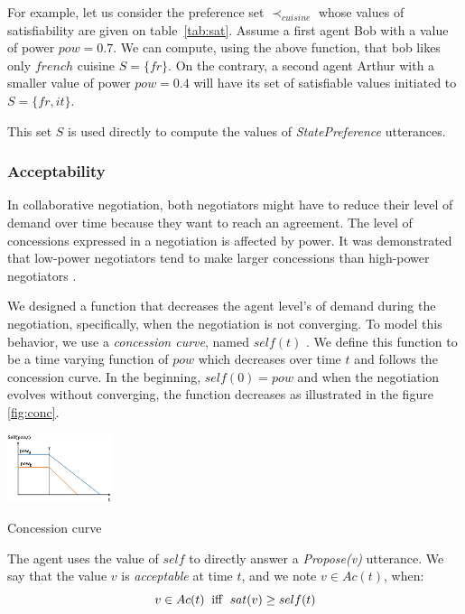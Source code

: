 \documentclass[conference, letterpaper]{IEEEtran}
\begin{document}
	For example, let us consider the preference set $\prec_{cuisine}$ whose values of satisfiability are given on table~\ref{tab:sat}. Assume a first agent Bob with a value of power $pow = 0.7$. We can compute, using the above function, that bob likes only $french$ cuisine $S= \{fr\}$. On the contrary, a second agent Arthur with a smaller value of power $pow=0.4$ will have its set of satisfiable values initiated to $S= \{fr, it\}$. 
	
    This set $S$ is used directly to compute the values of \emph{StatePreference} utterances.
	
	\subsubsection{Acceptability}
	\label{sec:acc}
	In collaborative negotiation, both negotiators might have to reduce their level of demand over time because they want to reach an agreement. The level of concessions expressed in a negotiation is affected by power. It was demonstrated that low-power negotiators tend to make larger concessions than high-power negotiators \cite{de1995impact}.
	
	We designed a function that decreases the agent level's of demand during the negotiation, specifically, when the negotiation is not converging.  To model this behavior, we use a \emph{concession curve}, named $self(t)$ . %
	We define this function to be a time varying function of $pow$ which decreases over time $t$ and follows the concession curve. In the beginning, $self(0) = pow$ and when the negotiation evolves without converging, the function decreases as illustrated in the figure \ref{fig:conc}.
	
	
	\begin{floatingfigure}[l]{1.2in}
		\captionsetup{justification=centering}
		\includegraphics[width=1.2in]{figs/s3.png}
		\caption{\label{fig:conc}Concession curve}
	\end{floatingfigure} 
	
	
	The agent uses the value of $self$ to directly answer a \emph{Propose(v)} utterance. We say that the value $v$ is \emph{acceptable} at time $t$, and we note $v \in Ac(t)$, when:
	\begin{equation}
	v\in Ac(t)\hspace{2mm}\mathrm{iff}\hspace{2mm}sat(v) \geq self(t)
	\end{equation}
	
\end{document}
